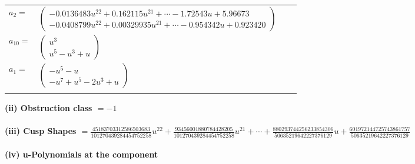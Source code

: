 \documentclass[1p]{elsarticle_modified}
\theoremstyle{definition}
\begin{document}
\begin{tabular}{m{7pt} m{180pt} m{7pt} m{180pt} }
\flushright $a_{2}=$&$\begin{pmatrix}-0.0136483 u^{22}+0.162115 u^{21}+\cdots-1.72543 u+5.96673\\-0.0408799 u^{22}+0.00329935 u^{21}+\cdots-0.954342 u+0.923420\end{pmatrix}$ \\
\flushright $a_{10}=$&$\begin{pmatrix}u^3\\u^5- u^3+u\end{pmatrix}$ \\
\flushright $a_{1}=$&$\begin{pmatrix}- u^5- u\\- u^7+u^5-2 u^3+u\end{pmatrix}$\\&\end{tabular}
\flushleft \textbf{(ii) Obstruction class $= -1$}\\~\\
\flushleft \textbf{(iii) Cusp Shapes $= \frac{45183703312586503683}{101270439284454752258} u^{22}+\frac{93456001880784428205}{101270439284454752258} u^{21}+\cdots+\frac{880293744256233854306}{50635219642227376129} u+\frac{601972144725743861757}{50635219642227376129}$}\\~\\
\newpage\renewcommand{\arraystretch}{1}
\flushleft \textbf{(iv) u-Polynomials at the component}\newline \\
\end{document}
